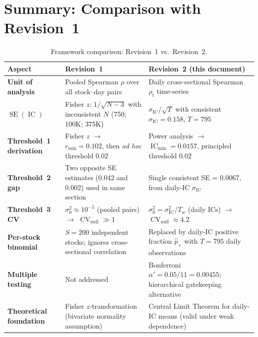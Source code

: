 \documentclass[11pt,a4paper]{article}
\theoremstyle{definition}
\newcommand{\IC}{\operatorname{IC}}
\newcommand{\SE}{\operatorname{SE}}
\newcommand{\CV}{\operatorname{CV}}
\begin{document}
\section{Summary: Comparison with Revision~1}
\label{sec:comparison}

\begin{table}[htbp]
\centering
\caption{Framework comparison: Revision~1 vs.\ Revision~2.}
\label{tab:comparison}
\begin{tabular}{p{3.5cm}p{3.8cm}p{3.8cm}}
\toprule
Aspect & Revision~1 & Revision~2 (this document) \\
\midrule
\textbf{Unit of analysis} &
  Pooled Spearman $\rho$ over all stock--day pairs &
  Daily cross-sectional Spearman $\rho_{t}$ time-series \\

\textbf{$\SE(\IC)$} &
  Fisher $z$: $1/\sqrt{N-3}$ with inconsistent $N$ (750; 100K; 375K) &
  $\sigma_{\IC}/\sqrt{T}$ with consistent $\sigma_{\IC}=0.158$, $T=795$ \\

\textbf{Threshold~1 derivation} &
  Fisher $z$ $\to$ $r_{\min}=0.102$, then \emph{ad hoc} threshold $0.02$ &
  Power analysis $\to$ $\IC_{\min}=0.0157$, principled threshold $0.02$ \\

\textbf{Threshold~2 gap} &
  Two opposite SE estimates (0.042 and 0.002) used in same section &
  Single consistent SE = 0.0067, from daily-IC $\sigma_{\IC}$ \\

\textbf{Threshold~3 CV} &
  $\sigma_{0}^{2}\approx 10^{-5}$ (pooled pairs) $\to$ $\CV_{\text{null}} \gg 1$ &
  $\sigma_{0}^{2} = \sigma_{\IC}^{2}/T_{w}$ (daily ICs) $\to$ $\CV_{\text{null}} \approx 4.2$ \\

\textbf{Per-stock binomial} &
  $S=200$ independent stocks; ignores cross-sectional correlation &
  Replaced by daily-IC positive fraction $\hat{p}_{+}$ with $T=795$ daily observations \\

\textbf{Multiple testing} &
  Not addressed &
  Bonferroni $\alpha'=0.05/11=0.00455$; hierarchical gatekeeping alternative \\

\textbf{Theoretical foundation} &
  Fisher $z$-transformation (bivariate normality assumption) &
  Central Limit Theorem for daily-IC means (valid under weak dependence) \\
\bottomrule
\end{tabular}
\end{table}
\end{document}
